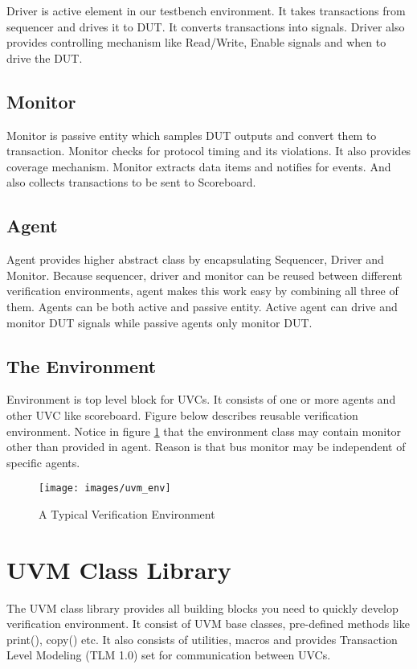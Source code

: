 Driver is active element in our testbench environment. It takes transactions from sequencer and drives it to DUT. It converts transactions into signals. Driver also provides controlling mechanism like Read/Write, Enable signals and when to drive the DUT.

\subsection{Monitor}

Monitor is passive entity which samples DUT outputs and convert them to transaction. Monitor checks for protocol timing and its violations. It also provides coverage mechanism. Monitor extracts data items and notifies for events. And also collects transactions to be sent to Scoreboard.

\subsection{Agent}

Agent provides higher abstract class by encapsulating Sequencer, Driver and Monitor. Because sequencer, driver and monitor can be reused between different verification environments, agent makes this work easy by combining all three of them. Agents can be both active and passive entity. Active agent can drive and monitor DUT signals while passive agents only monitor DUT.

\subsection{The Environment}

Environment is top level block for UVCs. It consists of one or more agents and other UVC like scoreboard. Figure below describes reusable verification environment. Notice in figure \ref{uvmenv} that the environment class may contain monitor other than provided in agent. Reason is that bus monitor may be independent of specific agents.

\begin{figure}[h]
\centering
\texttt{[image: images/uvm\_env]}
\caption{A Typical Verification Environment \label{uvmenv}}
\end{figure}

\section{UVM Class Library}

The UVM class library provides all building blocks you need to quickly develop verification environment. It consist of UVM base classes, pre-defined methods like print(), copy() etc. It also consists of utilities, macros and provides Transaction Level Modeling (TLM 1.0) set for communication between UVCs. \par

